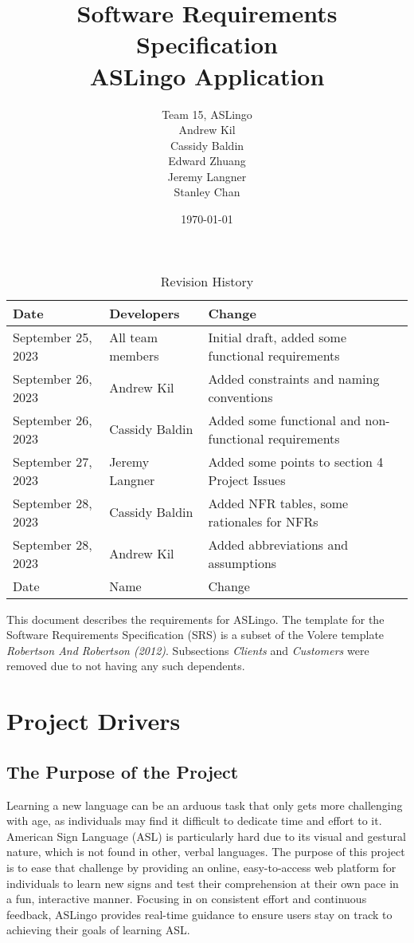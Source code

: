 \documentclass[12pt, titlepage]{article}
\title{Software Requirements Specification\\ASLingo Application}
\author{Team 15, ASLingo
		\\ Andrew Kil
		\\ Cassidy Baldin
		\\ Edward Zhuang
		\\ Jeremy Langner
		\\ Stanley Chan
}
\date{\today}
\begin{document}
\maketitle

\tableofcontents
\listoftables
\listoffigures

\begin{table}[H]
\caption{Revision History}
\begin{tabularx}{\textwidth}{|l|l|X|}
\toprule {\bf Date} & {\bf Developers} & {\bf Change}\\
\midrule
September 25, 2023 & All team members & Initial draft, added some functional requirements \\
September 26, 2023 & Andrew Kil & Added constraints and naming conventions \\
September 26, 2023 & Cassidy Baldin & Added some functional and non-functional requirements \\
September 27, 2023 & Jeremy Langner & Added some points to section 4 Project Issues \\
September 28, 2023 & Cassidy Baldin & Added NFR tables, some rationales for NFRs \\
September 28, 2023 & Andrew Kil & Added abbreviations and assumptions \\
Date & Name & Change\\
\bottomrule
\end{tabularx}
\end{table}

\newpage


This document describes the requirements for ASLingo. The template for the Software
Requirements Specification (SRS) is a subset of the Volere
template \textit{Robertson And Robertson (2012)}.  Subsections \textit{Clients} and \textit{Customers} were removed due to not having any such dependents.

\section{Project Drivers}

\subsection{The Purpose of the Project}

Learning a new language can be an arduous task that only gets more challenging
with age, as individuals may find it difficult to dedicate time and effort to
it. American Sign Language (ASL) is particularly hard due to its visual and
gestural nature, which is not found in other, verbal languages. The purpose of this project is
to ease that challenge by providing an online, easy-to-access web platform for
individuals to learn new signs and test their comprehension at their own pace
in a fun, interactive manner. Focusing in on consistent effort and continuous
feedback, ASLingo provides real-time guidance to ensure users stay on track to
achieving their goals of learning ASL.
\end{document}
